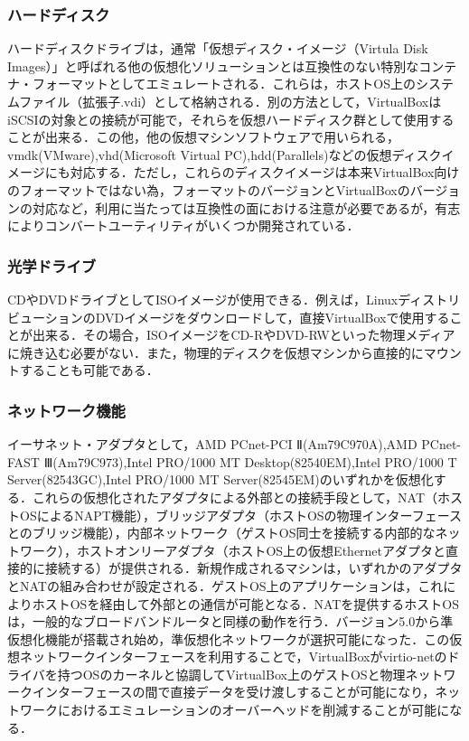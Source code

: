\subsubsection{ハードディスク}
ハードディスクドライブは，通常「仮想ディスク・イメージ（Virtula Disk Images）」と呼ばれる他の仮想化ソリューションとは互換性のない特別なコンテナ・フォーマットとしてエミュレートされる．これらは，ホストOS上のシステムファイル（拡張子.vdi）として格納される．別の方法として，VirtualBoxはiSCSIの対象との接続が可能で，それらを仮想ハードディスク群として使用することが出来る．この他，他の仮想マシンソフトウェアで用いられる，vmdk(VMware),vhd(Microsoft Virtual PC),hdd(Parallels)などの仮想ディスクイメージにも対応する．ただし，これらのディスクイメージは本来VirtualBox向けのフォーマットではない為，フォーマットのバージョンとVirtualBoxのバージョンの対応など，利用に当たっては互換性の面における注意が必要であるが，有志によりコンバートユーティリティがいくつか開発されている．

\subsubsection{光学ドライブ}
CDやDVDドライブとしてISOイメージが使用できる．例えば，LinuxディストリビューションのDVDイメージをダウンロードして，直接VirtualBoxで使用することが出来る．その場合，ISOイメージをCD-RやDVD-RWといった物理メディアに焼き込む必要がない．また，物理的ディスクを仮想マシンから直接的にマウントすることも可能である．

\newpage

\subsubsection{ネットワーク機能}
イーサネット・アダプタとして，AMD PCnet-PCI Ⅱ(Am79C970A),AMD PCnet-FAST Ⅲ(Am79C973),Intel PRO/1000 MT Desktop(82540EM),Intel PRO/1000 T Server(82543GC),Intel PRO/1000 MT Server(82545EM)のいずれかを仮想化する．これらの仮想化されたアダプタによる外部との接続手段として，NAT（ホストOSによるNAPT機能），ブリッジアダプタ（ホストOSの物理インターフェースとのブリッジ機能），内部ネットワーク（ゲストOS同士を接続する内部的なネットワーク），ホストオンリーアダプタ（ホストOS上の仮想Ethernetアダプタと直接的に接続する）が提供される．新規作成されるマシンは，いずれかのアダプタとNATの組み合わせが設定される．ゲストOS上のアプリケーションは，これによりホストOSを経由して外部との通信が可能となる．NATを提供するホストOSは，一般的なブロードバンドルータと同様の動作を行う．バージョン5.0から準仮想化機能が搭載され始め，準仮想化ネットワークが選択可能になった．この仮想ネットワークインターフェースを利用することで，VirtualBoxがvirtio-netのドライバを持つOSのカーネルと協調してVirtualBox上のゲストOSと物理ネットワークインターフェースの間で直接データを受け渡しすることが可能になり，ネットワークにおけるエミュレーションのオーバーヘッドを削減することが可能になる．

